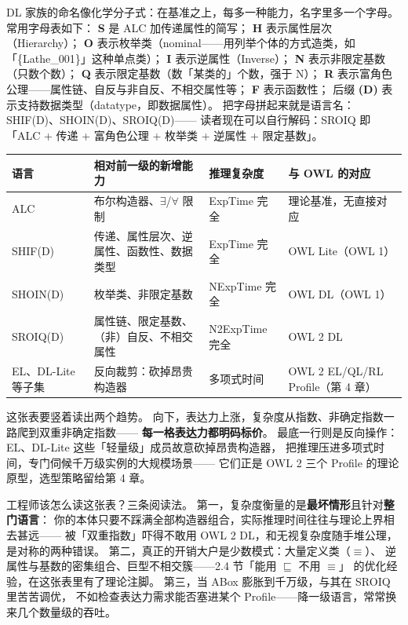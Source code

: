 DL 家族的命名像化学分子式：在基准之上，每多一种能力，名字里多一个字母。
常用字母表如下：
\textbf{S} 是 ALC 加传递属性的简写；
\textbf{H} 表示属性层次（Hierarchy）；
\textbf{O} 表示枚举类（nominal——用列举个体的方式造类，如「\{Lathe\_001\}」这种单点类）；
\textbf{I} 表示逆属性（Inverse）；
\textbf{N} 表示非限定基数（只数个数）；
\textbf{Q} 表示限定基数（数「某类的」个数，强于 N）；
\textbf{R} 表示富角色公理——属性链、自反与非自反、不相交属性等；
\textbf{F} 表示函数性；
后缀 \textbf{(D)} 表示支持数据类型（datatype，即数据属性）。
把字母拼起来就是语言名：SHIF(D)、SHOIN(D)、SROIQ(D)——
读者现在可以自行解码：SROIQ 即「ALC + 传递 + 富角色公理 + 枚举类 + 逆属性 + 限定基数」。

\begin{center}
\begin{tabularx}{\linewidth}{@{}lXlX@{}}
\toprule
\textbf{语言} & \textbf{相对前一级的新增能力} & \textbf{推理复杂度} & \textbf{与 OWL 的对应} \\
\midrule
ALC & 布尔构造器、\(\exists\)/\(\forall\) 限制 & ExpTime 完全 &
理论基准，无直接对应 \\
SHIF(D) & 传递、属性层次、逆属性、函数性、数据类型 & ExpTime 完全 &
OWL Lite（OWL 1） \\
SHOIN(D) & 枚举类、非限定基数 & NExpTime 完全 &
OWL DL（OWL 1） \\
SROIQ(D) & 属性链、限定基数、（非）自反、不相交属性 & N2ExpTime 完全 &
OWL 2 DL \\
EL、DL-Lite 等子集 & 反向裁剪：砍掉昂贵构造器 & 多项式时间 &
OWL 2 EL/QL/RL Profile（第 4 章） \\
\bottomrule
\end{tabularx}
\end{center}

这张表要竖着读出两个趋势。
向下，表达力上涨，复杂度从指数、非确定指数一路爬到双重非确定指数——
\textbf{每一格表达力都明码标价}。
最底一行则是反向操作：EL、DL-Lite 这些「轻量级」成员故意砍掉昂贵构造器，
把推理压进多项式时间，专门伺候千万级实例的大规模场景——
它们正是 OWL 2 三个 Profile 的理论原型，选型策略留给第 4 章。

工程师该怎么读这张表？三条阅读法。
第一，复杂度衡量的是\textbf{最坏情形}且针对\textbf{整门语言}：
你的本体只要不踩满全部构造器组合，实际推理时间往往与理论上界相去甚远——
被「双重指数」吓得不敢用 OWL 2 DL，和无视复杂度随手堆公理，是对称的两种错误。
第二，真正的开销大户是少数模式：大量定义类（\(\equiv\)）、
逆属性与基数的密集组合、巨型不相交簇——2.4 节「能用 \(\sqsubseteq\) 不用 \(\equiv\)」
的优化经验，在这张表里有了理论注脚。
第三，当 ABox 膨胀到千万级，与其在 SROIQ 里苦苦调优，
不如检查表达力需求能否塞进某个 Profile——降一级语言，常常换来几个数量级的吞吐。

